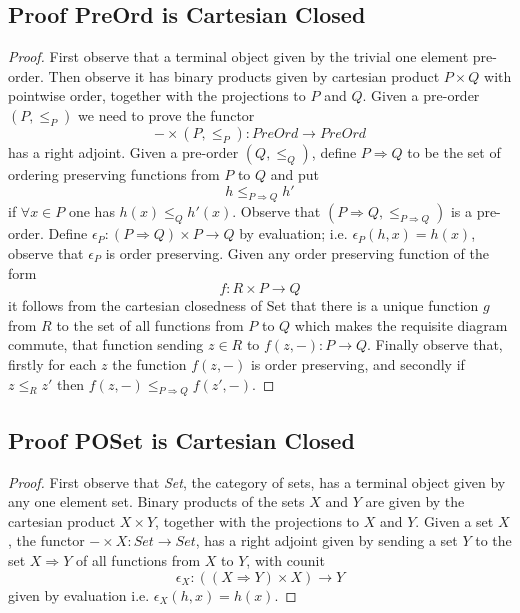 \documentclass{article}
\theoremstyle{definition}
\begin{document}
\subsection{Proof PreOrd is Cartesian Closed}
\begin{proof}
    First observe that a terminal object given by the trivial one element pre-order.
    Then observe it has binary products given by cartesian product $P \times Q$ with pointwise order,
    together with the projections to $P$ and $Q$.
    Given a pre-order $(P,\leq_P)$ we need to prove the functor
    $$- \times (P,\leq_P) : PreOrd \rightarrow PreOrd$$
    has a right adjoint.
    Given a pre-order $(Q,\leq_Q)$, define $P \Rightarrow Q$ to be
    the set of ordering preserving functions from $P$ to $Q$ and put
    $$h \leq_{P \Rightarrow Q} h\prime$$
    if $\forall x \in P$ one has $h(x) \leq_Q h\prime(x)$.
    Observe that $(P \Rightarrow Q, \leq_{P \Rightarrow Q})$ is a pre-order.
    Define $\epsilon_P : (P \Rightarrow Q) \times P \rightarrow Q$ by evaluation;
    i.e. $\epsilon_P(h, x) = h(x)$,
    observe that $\epsilon_P$ is order preserving.
    Given any order preserving function of the form
    $$f : R \times P \rightarrow Q$$
    it follows from the cartesian closedness of Set that there is a unique
    function $g$ from $R$ to the set of all functions from $P$ to $Q$
    which makes the requisite diagram commute,
    that function sending $z \in R$ to $f(z,−) : P \rightarrow Q$.
    Finally observe that,
    firstly for each $z$ the function $f(z,-)$ is order preserving,
    and secondly if $z \leq_R z\prime$ then $f(z,-) \leq_{P \Rightarrow Q} f(z\prime, -)$.


\end{proof}

\subsection{Proof POSet is Cartesian Closed}
\begin{proof}
    First observe that \textit{Set}, the category of sets,
    has a terminal object given by any one element set.
    Binary products of the sets $X$ and $Y$ are given by the
    cartesian product $X \times Y$,
    together with the projections to $X$ and $Y$.
    Given a set $X$, the functor $- \times X : Set \rightarrow Set$,
    has a right adjoint given by
    sending a set $Y$ to the set $X \Rightarrow Y$ of all functions from $X$ to $Y$,
    with counit
    $$\epsilon_X : ((X \Rightarrow Y) \times X) \rightarrow Y$$
    given by evaluation i.e. $\epsilon_X(h,x) = h(x)$.
\end{proof}
\end{document}

